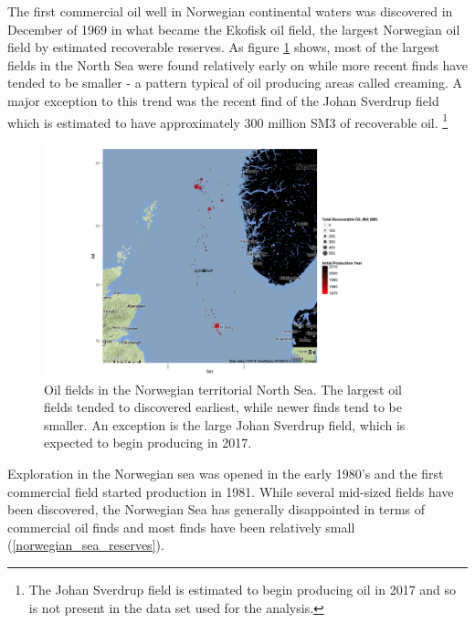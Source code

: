 \documentclass[12pt]{article}
\begin{document}
The first commercial oil well in Norwegian continental waters was discovered in December of 1969 in what became the Ekofisk oil field, the largest Norwegian oil field by estimated recoverable reserves.  As figure \ref{north_sea_reserves} shows, most of the largest fields in the North Sea were found relatively early on while more recent finds have tended to be smaller - a pattern typical of oil producing areas called creaming.  A major exception to this trend was the recent find of the Johan Sverdrup field which is estimated to have approximately 300 million SM3 of recoverable oil. \footnote{The Johan Sverdrup field is estimated to begin producing oil in 2017 and so is not present in the data set used for the analysis.}  

\begin{figure}
\includegraphics[width=1.2\textwidth]{figures/north_sea_reserves_print.png}
\caption{Oil fields in the Norwegian territorial North Sea.  The largest oil fields tended to discovered earliest, while newer finds tend to be smaller.  An exception is the large Johan Sverdrup field, which is expected to begin producing in 2017.}
\label{north_sea_reserves}
\end{figure}

Exploration in the Norwegian sea was opened in the early 1980’s and the first commercial field started production in 1981.  While several mid-sized fields have been discovered, the Norwegian Sea has generally disappointed in terms of commercial oil finds and most finds have been relatively small (\ref{norwegian_sea_reserves}).  
\end{document}
